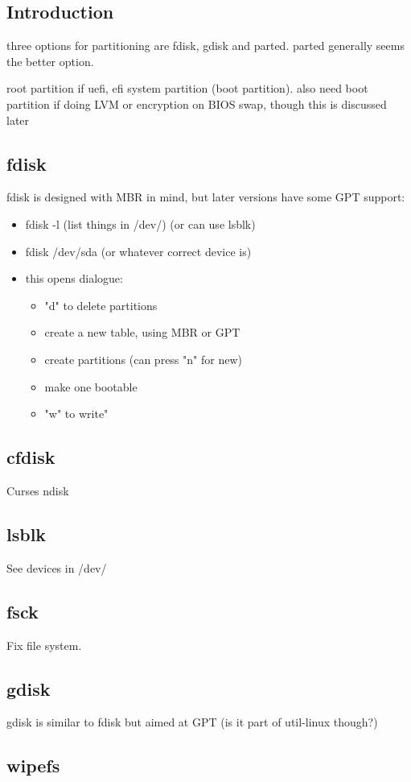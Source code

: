 
\subsection{Introduction}

three options for partitioning are fdisk, gdisk and parted. parted generally seems the better option.


root partition
if uefi, efi system partition (boot partition). also need boot partition if doing LVM or encryption on BIOS
swap, though this is discussed later

\subsection{fdisk}

fdisk is designed with MBR in mind, but later versions have some GPT support:

\begin{itemize}
  \item fdisk -l (list things in /dev/) (or can use lsblk)
  \item fdisk /dev/sda (or whatever correct device is)
  \item this opens dialogue:
  \begin{itemize}
    \item "d" to delete partitions
    \item create a new table, using MBR or GPT
    \item create partitions (can press "n" for new)
    \item make one bootable
    \item "w" to write"
  \end{itemize}
\end{itemize}

\subsection{cfdisk}

Curses ndisk

\subsection{lsblk}

See devices in /dev/
\subsection{fsck}

Fix file system.

\subsection{gdisk}

gdisk is similar to fdisk but aimed at GPT (is it part of util-linux though?)

\subsection{wipefs}

